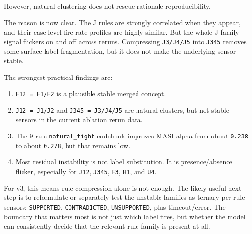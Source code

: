 \documentclass[11pt]{article}
\begin{document}
However, natural clustering does not rescue rationale reproducibility.

The reason is now clear. The J rules are strongly correlated when they appear, and their case-level fire-rate profiles are highly similar. But the whole J-family signal flickers on and off across reruns. Compressing \texttt{J3/J4/J5} into \texttt{J345} removes some surface label fragmentation, but it does not make the underlying sensor stable.

The strongest practical findings are:

\begin{enumerate}[leftmargin=1.5em]
  \item \texttt{F12 = F1/F2} is a plausible stable merged concept.
  \item \texttt{J12 = J1/J2} and \texttt{J345 = J3/J4/J5} are natural clusters, but not stable sensors in the current ablation rerun data.
  \item The 9-rule \texttt{natural\_tight} codebook improves MASI alpha from about \texttt{0.238} to about \texttt{0.278}, but that remains low.
  \item Most residual instability is not label substitution. It is presence/absence flicker, especially for \texttt{J12}, \texttt{J345}, \texttt{F3}, \texttt{H1}, and \texttt{U4}.
\end{enumerate}

For v3, this means rule compression alone is not enough. The likely useful next step is to reformulate or separately test the unstable families as ternary per-rule sensors: \texttt{SUPPORTED}, \texttt{CONTRADICTED}, \texttt{UNSUPPORTED}, plus timeout/error. The boundary that matters most is not just which label fires, but whether the model can consistently decide that the relevant rule-family is present at all.
\end{document}
